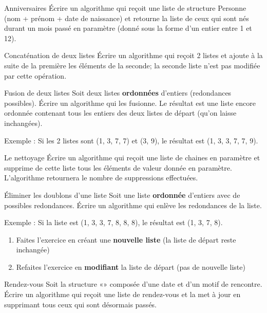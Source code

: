		\begin{Exercice}{Anniversaires}
				Écrire un algorithme qui reçoit une liste de structure Personne 
				(nom + prénom + date de naissance) et retourne la liste
				de ceux qui sont nés durant un mois passé en paramètre 
				(donné sous la forme d'un entier entre 1 et 12).
		\end{Exercice}
			
		\begin{Exercice}{Concaténation de deux listes}
				Écrire un algorithme qui reçoit 2 listes et ajoute
				à la suite de la première les éléments de la seconde; la seconde liste
				n'est pas modifiée par cette opération.
		\end{Exercice}
		
		\begin{Exercice}{Fusion de deux listes}
				Soit deux listes \textbf{ordonnées}
				d'entiers (redondances possibles). Écrire un algorithme
				qui les fusionne. Le résultat est une liste encore ordonnée contenant
				tous les entiers des deux listes de départ (qu'on
				laisse inchangées).
		
				Exemple : Si les 2 listes sont (1, 3, 7, 7) et (3, 9), 
				le résultat est (1, 3, 3, 7, 7, 9).
		\end{Exercice}
		
		\begin{Exercice}{Le nettoyage}
			Écrire un algorithme qui reçoit une liste de chaines en paramètre et
			supprime de cette liste tous les éléments de valeur donnée en
			paramètre. L'algorithme retournera le nombre de
			suppressions effectuées.
		\end{Exercice}
			
		\begin{Exercice}{Éliminer les doublons d'une liste}
				Soit une liste \textbf{ordonnée} 
				d'entiers avec de possibles redondances. Écrire un
				algorithme qui enlève les redondances de la liste.
						
				Exemple : Si la liste est (1, 3, 3, 7, 8, 8, 8),
				le résultat est (1, 3, 7, 8).
		
				\begin{enumerate}[label=\alph*)]
					\item 
						Faites l'exercice en créant une \textbf{nouvelle
						liste} (la liste de départ reste inchangée)
					\item 
						Refaites l'exercice en \textbf{modifiant}
						la liste de départ (pas de nouvelle liste)
				\end{enumerate}
		\end{Exercice}
				
		\begin{Exercice}{Rendez-vous}
			Soit la structure «» composée d’une date
			et d’un motif de rencontre. Écrire un algorithme qui reçoit une liste de
			rendez-vous et la met à jour en supprimant tous ceux qui sont désormais
			passés. 
		\end{Exercice}
		
	
